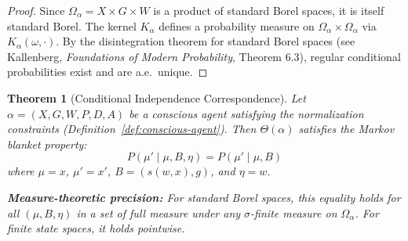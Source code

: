 \documentclass[11pt,a4paper]{article}
\theoremstyle{definition}
\theoremstyle{plain}
\newtheorem{theorem}[definition]{Theorem}
\theoremstyle{remark}
\begin{document}
\begin{proof}
Since $\Omega_\alpha = X \times G \times W$ is a product of standard Borel spaces, it is itself standard Borel. The kernel $K_\alpha$ defines a probability measure on $\Omega_\alpha \times \Omega_\alpha$ via $K_\alpha(\omega, \cdot)$. By the disintegration theorem for standard Borel spaces (see Kallenberg, \textit{Foundations of Modern Probability}, Theorem 6.3), regular conditional probabilities exist and are a.e.\ unique.
\end{proof}

\begin{theorem}[Conditional Independence Correspondence]\label{thm:main}
Let $\alpha = (X, G, W, P, D, A)$ be a conscious agent satisfying the normalization constraints (Definition~\ref{def:conscious-agent}). Then $\Theta(\alpha)$ satisfies the Markov blanket property:
\begin{equation}
P(\mu' \mid \mu, B, \eta) = P(\mu' \mid \mu, B)
\end{equation}
where $\mu = x$, $\mu' = x'$, $B = (s(w,x), g)$, and $\eta = w$.

\textbf{Measure-theoretic precision:} For standard Borel spaces, this equality holds for all $(\mu, B, \eta)$ in a set of full measure under any $\sigma$-finite measure on $\Omega_\alpha$. For finite state spaces, it holds pointwise.
\end{theorem}
\end{document}
